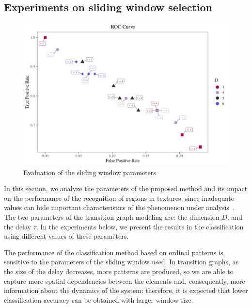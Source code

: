 \documentclass[journal]{IEEEtran}
\begin{document}
\subsection{Experiments on sliding window selection}

\begin{figure}[h]
	\includegraphics[width=\columnwidth]{Figures/ROC.pdf}	\caption{Evaluation of the sliding window parameters}
	\label{fig:ROC}
\end{figure} 

In this section, we analyze the parameters of the proposed method and its impact on the performance of the recognition of regions in textures, since inadequate values can hide important characteristics of the phenomenon under analysis~\cite{mccullough2015time}.
The two parameters of the transition graph modeling are: the dimension $D$, and the delay $\tau$.
In the experiments below, we present the results in the classification using different values of these parameters.

The performance of the classification method based on ordinal patterns is sensitive to the parameters of the sliding window used.
In transition graphs, as the size of the delay decreases, more patterns are produced, so we are able to capture more spatial dependencies between the elements and, consequently, more information about the dynamics of the system; therefore, it is expected that lower classification accuracy can be obtained with larger window size. 
\end{document}

